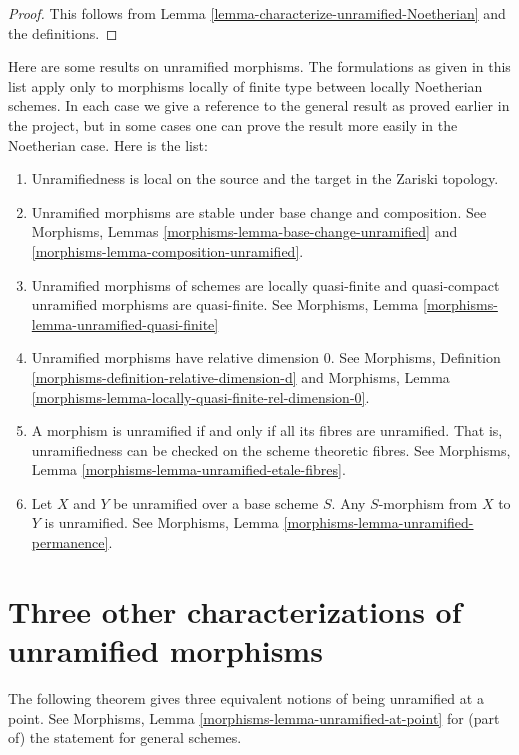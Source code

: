 \begin{proof}
This follows from Lemma \ref{lemma-characterize-unramified-Noetherian}
and the definitions.
\end{proof}

\noindent
Here are some results on unramified morphisms.
The formulations as given in this list apply only to
morphisms locally of finite type between locally Noetherian schemes.
In each case we give a reference to the general result as
proved earlier in the project, but in some cases one can
prove the result more easily in the Noetherian case.
Here is the list:
\begin{enumerate}
\item Unramifiedness is local on the source and the target in the Zariski
topology.
\item Unramified morphisms are stable under base change and composition.
See Morphisms, Lemmas \ref{morphisms-lemma-base-change-unramified}
and \ref{morphisms-lemma-composition-unramified}.
\item Unramified morphisms of schemes are locally quasi-finite
and quasi-compact unramified morphisms are quasi-finite.
See Morphisms, Lemma \ref{morphisms-lemma-unramified-quasi-finite}
\item Unramified morphisms have relative dimension $0$. See
Morphisms, Definition \ref{morphisms-definition-relative-dimension-d}
and
Morphisms, Lemma \ref{morphisms-lemma-locally-quasi-finite-rel-dimension-0}.
\item A morphism is unramified if and only if all its fibres are unramified.
That is, unramifiedness can be checked on the scheme theoretic fibres. See
Morphisms, Lemma \ref{morphisms-lemma-unramified-etale-fibres}.
\item Let $X$ and $Y$ be unramified over a base scheme $S$.
Any $S$-morphism from $X$ to $Y$ is unramified.
See Morphisms, Lemma \ref{morphisms-lemma-unramified-permanence}.
\end{enumerate}

\section{Three other characterizations of unramified morphisms}
\label{section-three-other}

\noindent
The following theorem gives three equivalent notions of being
unramified at a point. See
Morphisms, Lemma \ref{morphisms-lemma-unramified-at-point}
for (part of) the statement for general schemes.

